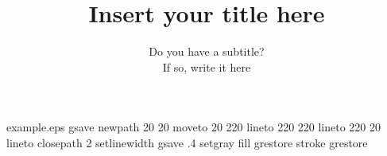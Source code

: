 %
%
%
%
\begin{filecontents*}{example.eps}
gsave
newpath
  20 20 moveto
  20 220 lineto
  220 220 lineto
  220 20 lineto
closepath
2 setlinewidth
gsave
  .4 setgray fill
grestore
stroke
grestore
\end{filecontents*}
%
\RequirePackage{fix-cm}
%
\documentclass[smallextended]{svjour3}       %
%
\smartqed  %
%
\usepackage{graphicx}
\usepackage{tkz-graph}
\usepackage{amsmath, amssymb}
\usepackage{graphicx}
\usepackage{tikz}
\usepackage{amsfonts}
\usepackage{subcaption}
\usepackage{hyperref}
\usepackage{color}	%
\usepackage{enumerate}
\usepackage{enumitem}
\usepackage{mathtools}
\usepackage{color}

\captionsetup{compatibility=false}





%
%
%
%
%


\title{Insert your title here%
}
\subtitle{Do you have a subtitle?\\ If so, write it here}

